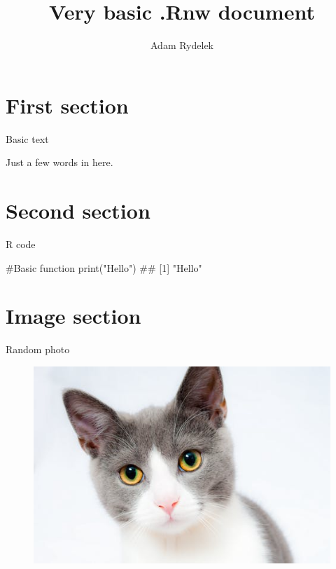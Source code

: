 \documentclass[ignorenonframetext,]{beamer}
\title{Very basic .Rnw document}
\author{Adam Rydelek}
\date{}
\newenvironment{Shaded}{}{}
\newcommand{\KeywordTok}[1]{\textcolor[rgb]{0.00,0.00,1.00}{#1}}
\newcommand{\StringTok}[1]{\textcolor[rgb]{0.00,0.50,0.50}{#1}}
\newcommand{\CommentTok}[1]{\textcolor[rgb]{0.00,0.50,0.00}{#1}}
\newcommand{\NormalTok}[1]{#1}
\begin{document}
\frame{\titlepage}


\section[]{}

\section{First section}\label{first-section}

\begin{frame}{Basic text}

Just a few words in here.

\end{frame}

\section{Second section}\label{second-section}

\begin{frame}[fragile]{R code}

\scriptsize

\begin{Shaded}
\begin{Highlighting}[]
\CommentTok{#Basic function}
\KeywordTok{print}\NormalTok{(}\StringTok{"Hello"}\NormalTok{)}
\NormalTok{## [1] "Hello"}
\end{Highlighting}
\end{Shaded}

\end{frame}

\section{Image section}\label{image-section}

\begin{frame}{Random photo}

\begin{figure}
\centering
\includegraphics{cat.jpeg}
\caption{}
\end{figure}

\end{frame}
\end{document}
